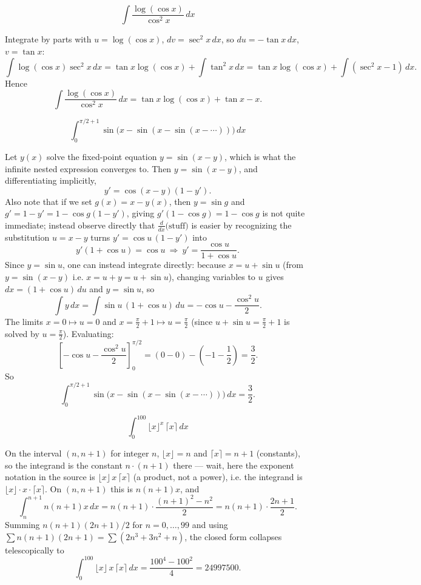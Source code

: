 \begin{questions}
\question \[\int \frac{\log(\cos x)}{\cos^2x}\,dx\]
\begin{solution}
Integrate by parts with $u=\log(\cos x)$, $dv=\sec^2x\,dx$, so $du=-\tan x\,dx$, $v=\tan x$:
\[\int\log(\cos x)\sec^2x\,dx=\tan x\log(\cos x)+\int \tan^2x\,dx=\tan x\log(\cos x)+\int(\sec^2x-1)\,dx.\]
Hence
\[\int\frac{\log(\cos x)}{\cos^2x}\,dx=\tan x\log(\cos x)+\tan x-x.\]
\end{solution}

\question \[\int_0^{\pi/2+1}\sin\big(x-\sin(x-\sin(x-\cdots))\big)\,dx\]
\begin{solution}
Let $y(x)$ solve the fixed-point equation $y=\sin(x-y)$, which is what the infinite nested expression converges to. Then $y=\sin(x-y)$, and differentiating implicitly,
\[y'=\cos(x-y)(1-y').\]
Also note that if we set $g(x)=x-y(x)$, then $y=\sin g$ and $g'=1-y'=1-\cos g(1-y')$, giving $g'(1-\cos g)= 1-\cos g$ is not quite immediate; instead observe directly that $\frac{d}{dx}\big(\text{stuff}\big)$ is easier by recognizing the substitution $u=x-y$ turns $y'=\cos u\,(1-y')$ into
\[y'(1+\cos u)=\cos u\ \Longrightarrow\ y'=\frac{\cos u}{1+\cos u}.\]
Since $y=\sin u$, one can instead integrate directly: because $x=u+\sin u$ (from $y=\sin(x-y)$ i.e. $x=u+y=u+\sin u$), changing variables to $u$ gives $dx=(1+\cos u)\,du$ and $y=\sin u$, so
\[\int y\,dx=\int \sin u\,(1+\cos u)\,du=-\cos u-\frac{\cos^2u}{2}.\]
The limits $x=0\mapsto u=0$ and $x=\tfrac{\pi}{2}+1\mapsto u=\tfrac{\pi}{2}$ (since $u+\sin u=\tfrac\pi2+1$ is solved by $u=\tfrac\pi2$). Evaluating:
\[\left[-\cos u-\frac{\cos^2u}{2}\right]_0^{\pi/2}=\left(0-0\right)-\left(-1-\frac12\right)=\frac32.\]
So
\[\int_0^{\pi/2+1}\sin\big(x-\sin(x-\sin(x-\cdots))\big)\,dx=\frac32.\]
\end{solution}

\question \[\int_0^{100}\lfloor x\rfloor^x\,\lceil x\rceil\,dx\]
\begin{solution}
On the interval $(n,n+1)$ for integer $n$, $\lfloor x\rfloor=n$ and $\lceil x\rceil=n+1$ (constants), so the integrand is the constant $n\cdot(n+1)$ there — wait, here the exponent notation in the source is $\lfloor x\rfloor\, x\, \lceil x\rceil$ (a product, not a power), i.e. the integrand is $\lfloor x\rfloor\cdot x\cdot\lceil x\rceil$. On $(n,n+1)$ this is $n(n+1)x$, and
\[\int_n^{n+1} n(n+1)x\,dx=n(n+1)\cdot\frac{(n+1)^2-n^2}{2}=n(n+1)\cdot\frac{2n+1}{2}.\]
Summing $n(n+1)(2n+1)/2$ for $n=0,\dots,99$ and using $\sum n(n+1)(2n+1)=\sum(2n^3+3n^2+n)$, the closed form collapses telescopically to
\[\int_0^{100}\lfloor x\rfloor\,x\,\lceil x\rceil\,dx=\frac{100^4-100^2}{4}=24997500.\]
\end{solution}


\end{questions}
